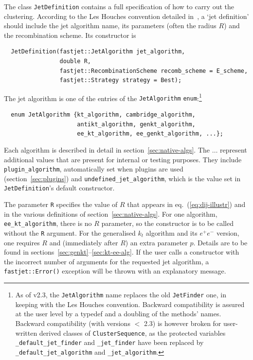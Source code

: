\documentclass[12pt,a4]{article}
\newcommand{\ttt}[1]{{\small\texttt{#1}}}
\begin{document}
The class \ttt{JetDefinition} contains a full specification
of how to carry out the clustering. According to the Les Houches convention 
detailed in~\cite{Buttar:2008jx}, a `jet definition' should include the 
jet algorithm name, its parameters (often the radius $R$) and the 
recombination scheme.
Its constructor is
%
\begin{lstlisting}
  JetDefinition(fastjet::JetAlgorithm jet_algorithm,
                double R,
                fastjet::RecombinationScheme recomb_scheme = E_scheme,
                fastjet::Strategy strategy = Best);
\end{lstlisting}
%
The jet algorithm is one of the entries of the \ttt{JetAlgorithm}
\ttt{enum}:\footnote{As of v2.3, the \ttt{JetAlgorithm} name replaces the old \ttt{JetFinder}
one, in keeping with the Les Houches convention. Backward compatibility is
assured at the user level by a typedef and a doubling of the methods' names.
Backward compatibility (with versions $<$ 2.3) is however broken for 
user-written derived classes of \ttt{ClusterSequence}, as the protected 
variables \ttt{\_default\_jet\_finder} and  \ttt{\_jet\_finder} have been 
replaced by \ttt{\_default\_jet\_algorithm} and \ttt{\_jet\_algorithm}.}
\begin{lstlisting}
  enum JetAlgorithm {kt_algorithm, cambridge_algorithm,
                     antikt_algorithm, genkt_algorithm,
                     ee_kt_algorithm, ee_genkt_algorithm, ...};
\end{lstlisting}
Each algorithm is described in detail in section~\ref{sec:native-algs}.
%
The $\ldots$ represent additional values that are present for 
internal or testing purposes. They include
\ttt{plugin\_algorithm}, automatically set when plugins are used
(section~\ref{sec:plugins}) and  \ttt{undefined\_jet\_algorithm}, 
which is the value set in \ttt{JetDefinition}'s default constructor.


The parameter \texttt{R} specifies the value of $R$ that appears in
eq.~(\ref{eq:dij-illustr}) and in the various definitions of
section~\ref{sec:native-algs}.
%
For one algorithm, \verb:ee_kt_algorithm:, there is no $R$ parameter,
so the constructor is to be called without the \verb:R: argument.
%
For the generalised $k_t$ algorithm and its $e^+e^-$ version, one
requires $R$ and (immediately after $R$) an extra
parameter $p$.
%
Details are to be found in sections~\ref{sec:genkt}--\ref{sec:kt-ee-alg}.
%
If the user calls a constructor with the incorrect number of arguments
for the requested jet algorithm, a \ttt{fastjet::Error()} exception
will be thrown with an explanatory message.
%
\end{document}
